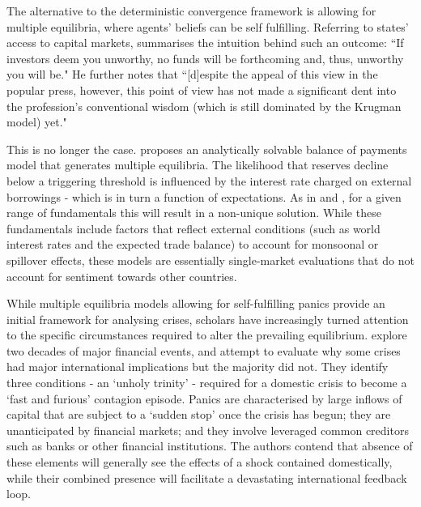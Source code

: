 \documentclass[../base.tex]{subfiles}
\begin{document}

The alternative to the deterministic convergence framework is allowing for multiple equilibria, where agents' beliefs can be self fulfilling. Referring to states' access to capital markets, \cite{calvo1995varieties} summarises the intuition behind such an outcome: ``If investors deem you unworthy, no funds will be forthcoming and, thus, unworthy you will be." He further notes that ``[d]espite the appeal of this view in the popular press, however, this point of view has not made a significant dent into the profession's conventional wisdom (which is still dominated by the Krugman model) yet."

This is no longer the case. \cite{masson1999contagion} proposes an analytically solvable balance of payments model that generates multiple equilibria. The likelihood that reserves decline below a triggering threshold is influenced by the interest rate charged on external borrowings - which is in turn a function of expectations. As in \cite{obstfeld1996models} and \cite{jeanne1997currency}, for a given range of fundamentals this will result in a non-unique solution. While these fundamentals include factors that reflect external conditions (such as world interest rates and the expected trade balance) to account for monsoonal or spillover effects, these models are essentially single-market evaluations that do not account for sentiment towards other countries. 

While multiple equilibria models allowing for self-fulfilling panics provide an initial framework for analysing crises, scholars have increasingly turned attention to the specific circumstances required to alter the prevailing equilibrium. \cite{kaminsky2003unholy} explore two decades of major financial events, and attempt to evaluate why some crises had major international implications but the majority did not. They identify three conditions - an `unholy trinity' - required for a domestic crisis to become a `fast and furious' contagion episode. Panics are characterised by large inflows of capital that are subject to a `sudden stop' once the crisis has begun; they are unanticipated by financial markets; and they involve leveraged common creditors such as banks or other financial institutions. The authors contend that absence of these elements will generally see the effects of a shock contained domestically, while their combined presence will facilitate a devastating international feedback loop. 

\end{document}
